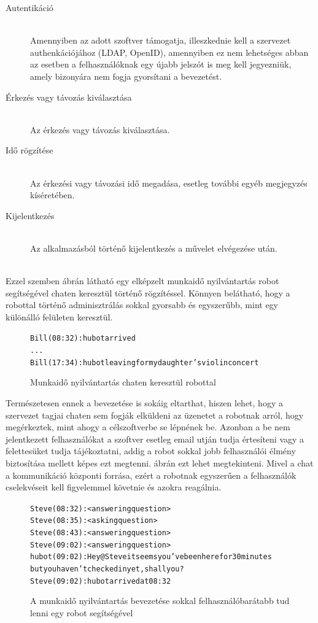 \begin{description}
  \item[Autentikáció]\hfill\\
  Amennyiben az adott szoftver támogatja, illeszkednie kell a szervezet authenkációjához (LDAP, OpenID), amennyiben ez nem lehetséges abban az esetben a felhasználóknak egy újabb jelszót is meg kell jegyezniük, amely bizonyára nem fogja gyorsítani a bevezetést.
  \item[Érkezés vagy távozás kiválasztása]\hfill\\
  Az érkezés vagy távozás kiválasztása.
  \item[Idő rögzítése]\hfill\\
  Az érkezési vagy távozási idő megadása, esetleg további egyéb megjegyzés kíséretében.
  \item[Kijelentkezés]\hfill\\
  Az alkalmazásból történő kijelentkezés a művelet elvégezése után.
\end{description}
\hfill\\
Ezzel szemben  ábrán látható egy elképzelt munkaidő nyilvántartás robot segítségével chaten keresztül történő rögzítéssel. Könnyen belátható, hogy a robottal történő adminisztrálás sokkal gyorsabb és egyszerűbb, mint egy különálló felületen keresztül.

\begin{figure}
  \begin{alltt}
Bill (08:32): hubot arrived
...
Bill (17:34): hubot leaving for my daughter's violin concert
  \end{alltt}
  \caption[DUMMY]%
    {Munkaidő nyilvántartás chaten keresztül robottal}%
    \label{lst:workhour_with_hubot}
\end{figure}

Természetesen ennek a bevezetése is sokáig eltarthat, hiszen lehet, hogy a szervezet tagjai chaten sem fogják elküldeni az üzenetet a robotnak arról, hogy megérkeztek, mint ahogy a célszoftverbe se lépnének be. Azonban a be nem jelentkezett felhasználókat a szoftver esetleg email utján tudja értesíteni vagy a felettesüket tudja tájékoztatni, addig a robot sokkal jobb felhasználói élmény biztosítása mellett képes ezt megtenni.  ábrán ezt lehet megtekinteni. Mivel a chat a kommunikáció központi forrása, ezért a robotnak egyszerűen a felhasználók cselekvéseit kell figyelemmel követnie és azokra reagálnia.

\begin{figure}
  \begin{alltt}
Steve (08:32): <answering question>
Steve (08:35): <asking question>
Steve (08:43): <answering question>
Steve (09:02): <answering question>
hubot (09:02): Hey @Steve it seems you've been here for 30 minutes
               but you haven't checked in yet, shall you?
Steve (09:02): hubot arrived at 08:32
    \end{alltt}
    \caption[DUMMY]%
    {A munkaidő nyilvántartás bevezetése sokkal felhasználóbarátabb tud lenni egy robot segítségével}%
    \label{lst:workhour_with_hubot_ux}
\end{figure}

